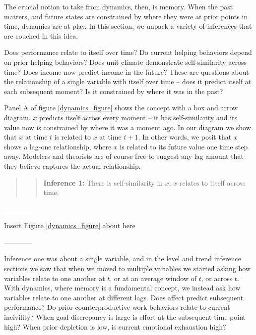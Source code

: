 \documentclass[english,,man]{apa6}
\theoremstyle{definition}
\theoremstyle{definition}
\theoremstyle{definition}
\theoremstyle{remark}
\begin{document}
The crucial notion to take from dynamics, then, is memory. When the past
matters, and future states are constrained by where they were at prior
points in time, dynamics are at play. In this section, we unpack a
variety of inferences that are couched in this idea.

Does performance relate to itself over time? Do current helping
behaviors depend on prior helping behaviors? Does unit climate
demonstrate self-similarity across time? Does income now predict income
in the future? These are questions about the relationship of a single
variable with itself over time -- does it predict itself at each
subsequent moment? Is it constrained by where it was in the past?

Panel A of figure \ref{dynamics_figure} shows the concept with a box and
arrow diagram. \(x\) predicts itself across every moment -- it has
self-similarity and its value now is constrained by where it was a
moment ago. In our diagram we show that \(x\) at time \(t\) is related
to \(x\) at time \(t + 1\). In other words, we posit that \(x\) shows a
lag-one relationship, where \(x\) is related to its future value one
time step away. Modelers and theorists are of course free to suggest any
lag amount that they believe captures the actual relationship.

\begin{quote}
\begin{quote}
\textbf{Inference 1:} There is self-similarity in \(x\); \(x\) relates
to itself across time.
\end{quote}
\end{quote}

\begin{center}

------------

Insert Figure \ref{dynamics_figure} about here

------------

\end{center}

Inference one was about a single variable, and in the level and trend
inference sections we saw that when we moved to multiple variables we
started asking how variables relate to one another at \(t\), or at an
average window of \(t\), or across \(t\). With dynamics, where memory is
a fundamental concept, we instead ask how variables relate to one
another at different lags. Does affect predict subsequent performance?
Do prior counterproductive work behaviors relate to current incivility?
When goal discrepancy is large is effort at the subsequent time point
high? When prior depletion is low, is current emotional exhaustion high?
\end{document}
